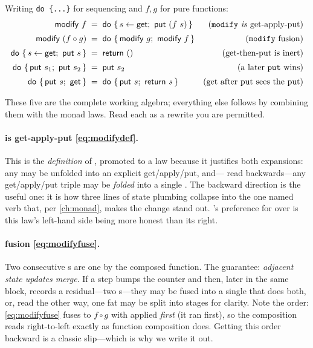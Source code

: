 \begin{lemma}
\label{lem:state}
Writing \lstinline[style=l4style]|do {...}| for sequencing and $f, g$ for pure
 functions:
\begin{align}
  \textsf{modify}\ f
    &\;=\; \textsf{do}\ \{\, s \leftarrow \textsf{get};\ \textsf{put}\ (f\ s) \,\}
    & \text{(\code{modify} \emph{is} get-apply-put)} \label{eq:modifydef}\\[2pt]
  \textsf{modify}\ (f \circ g)
    &\;=\; \textsf{do}\ \{\, \textsf{modify}\ g;\ \textsf{modify}\ f \,\}
    & \text{(\code{modify} fusion)} \label{eq:modifyfuse}\\[2pt]
  \textsf{do}\ \{\, s \leftarrow \textsf{get};\ \textsf{put}\ s \,\}
    &\;=\; \textsf{return}\ ()
    & \text{(get-then-put is inert)} \label{eq:getput}\\[2pt]
  \textsf{do}\ \{\, \textsf{put}\ s_1;\ \textsf{put}\ s_2 \,\}
    &\;=\; \textsf{put}\ s_2
    & \text{(a later \code{put} wins)} \label{eq:putput}\\[2pt]
  \textsf{do}\ \{\, \textsf{put}\ s;\ \textsf{get} \,\}
    &\;=\; \textsf{do}\ \{\, \textsf{put}\ s;\ \textsf{return}\ s \,\}
    & \text{(get after put sees the put)} \label{eq:putget}
\end{align}
\end{lemma}

\noindent These five are the complete working algebra; everything else follows by
combining them with the monad laws. Read each as a rewrite you are permitted.

\paragraph{ is get-apply-put \eqref{eq:modifydef}.} This is the
\emph{definition} of , promoted to a law because it justifies both
expansions: any  may be unfolded into an explicit get/apply/put, and---
read backwards---any get/apply/put triple may be \emph{folded} into a single
. The backward direction is the useful one: it is how three lines of
state plumbing collapse into the one named verb that, per \cref{ch:monad}, makes the
change stand out. 's preference for  over  is
this law's left-hand side being more honest than its right.

\paragraph{ fusion \eqref{eq:modifyfuse}.} Two consecutive
s are one  by the composed function. The guarantee:
\emph{adjacent state updates merge}. If a step bumps the counter and then, later in
the same block, records a residual---two s---they may be fused into a
single  that does both, or, read the other way, one fat 
may be split into stages for clarity. Note the order: \eqref{eq:modifyfuse} fuses to
$f \circ g$ with  applied \emph{first} (it ran first), so the composition
reads right-to-left exactly as function composition does. Getting this order backward
is a classic slip---which is why we write it out.

